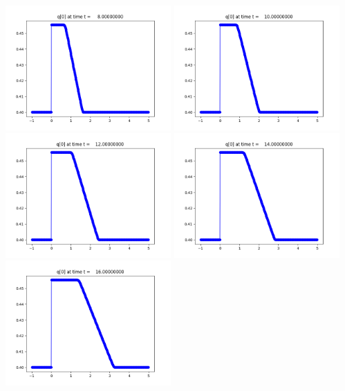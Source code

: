 \documentclass[11pt]{article}
\begin{document}
\vskip 10pt 
\includegraphics[width=0.475\textwidth]{frame0004fig0.png}
\vskip 10pt 
\includegraphics[width=0.475\textwidth]{frame0005fig0.png}
\vskip 10pt 
\includegraphics[width=0.475\textwidth]{frame0006fig0.png}
\vskip 10pt 
\includegraphics[width=0.475\textwidth]{frame0007fig0.png}
\vskip 10pt 
\includegraphics[width=0.475\textwidth]{frame0008fig0.png}
\end{document}
